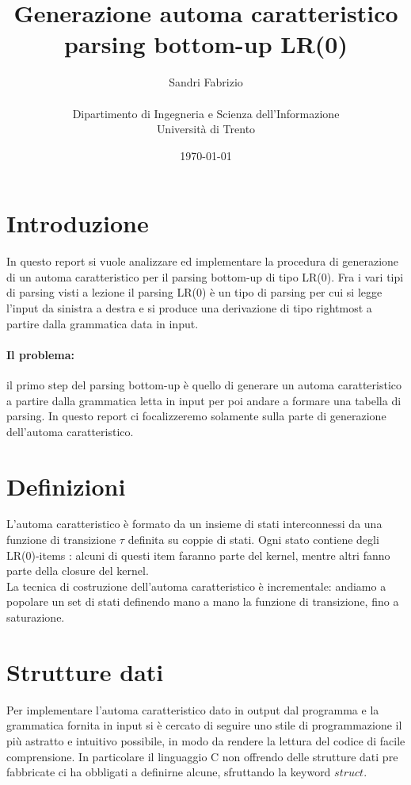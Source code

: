 \documentclass[12pt]{article}
\title{Generazione automa caratteristico parsing bottom-up LR(0) }
\author{
        Sandri Fabrizio \\ \\        
        Dipartimento di Ingegneria e Scienza dell'Informazione\\
        Università di Trento
}
\date{\today}
\begin{document}
\maketitle

\section{Introduzione}
In questo report si vuole analizzare ed implementare la procedura di generazione di un automa caratteristico per il parsing bottom-up di tipo LR(0). Fra i vari tipi di parsing visti a lezione il parsing LR(0) è un tipo di parsing per cui si legge l'input da sinistra a destra e si produce una derivazione di tipo rightmost a partire dalla grammatica data in input.

\paragraph{Il problema:} 
il primo step del parsing bottom-up è quello di generare un automa caratteristico a partire dalla grammatica letta in input per poi andare a formare una tabella di parsing. In questo report ci focalizzeremo solamente sulla parte di generazione dell'automa caratteristico.

\section{Definizioni}
L'automa caratteristico è formato da un insieme di stati interconnessi da una funzione di transizione $\tau$ definita su coppie di stati. 
Ogni stato contiene degli LR(0)-items : alcuni di questi item faranno parte del kernel, mentre altri fanno parte della closure del kernel.\\

La tecnica di costruzione dell'automa caratteristico è incrementale: andiamo a popolare un set di stati definendo mano a mano la funzione di transizione, fino a saturazione.


\section{Strutture dati}
Per implementare l'automa caratteristico dato in output dal programma e la grammatica fornita in input si è cercato di seguire uno stile di programmazione il più astratto e intuitivo possibile, in modo da rendere la lettura del codice di facile comprensione. In particolare il linguaggio C non offrendo delle strutture dati pre fabbricate ci ha obbligati a definirne alcune, sfruttando la keyword $struct$.\\
\end{document}
